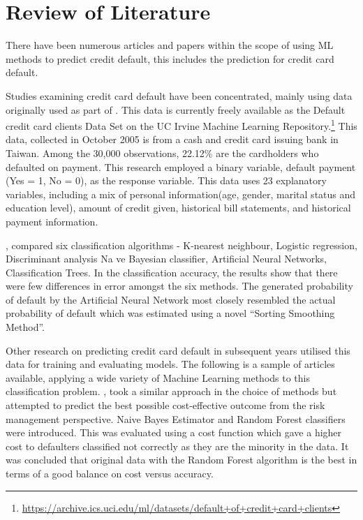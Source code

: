 \documentclass[
]{article}
\author{}
\date{\vspace{-2.5em}}
\begin{document}

\hypertarget{review-of-literature}{%
\section{Review of Literature}\label{review-of-literature}}

There have been numerous articles and papers within the scope of using
ML methods to predict credit default, this includes the prediction for
credit card default.

Studies examining credit card default have been concentrated, mainly
using data originally used as part of \citet{YEH20092473}. This data is
currently freely available as the Default credit card clients Data Set
on the UC Irvine Machine Learning Repository.\footnote{\url{https://archive.ics.uci.edu/ml/datasets/default+of+credit+card+clients}}
This data, collected in October 2005 is from a cash and credit card
issuing bank in Taiwan. Among the 30,000 observations, 22.12\% are the
cardholders who defaulted on payment. This research employed a binary
variable, default payment (Yes = 1, No = 0), as the response variable.
This data uses 23 explanatory variables, including a mix of personal
information(age, gender, marital status and education level), amount of
credit given, historical bill statements, and historical payment
information.

\citet{YEH20092473}, compared six classification algorithms - K-nearest
neighbour, Logistic regression, Discriminant analysis Na ve
Bayesian classifier, Artificial Neural Networks, Classification Trees.
In the classification accuracy, the results show that there were few
differences in error amongst the six methods. The generated probability
of default by the Artificial Neural Network most closely resembled the
actual probability of default which was estimated using a novel
``Sorting Smoothing Method''.

Other research on predicting credit card default in subsequent years
utilised this data for training and evaluating models. The following is
a sample of articles available, applying a wide variety of Machine
Learning methods to this classification problem. \citet{Neema2017TheCO},
took a similar approach in the choice of methods but attempted to
predict the best possible cost-effective outcome from the risk
management perspective. Naive Bayes Estimator and Random Forest
classifiers were introduced. This was evaluated using a cost function
which gave a higher cost to defaulters classified not correctly as they
are the minority in the data. It was concluded that original data with
the Random Forest algorithm is the best in terms of a good balance on
cost versus accuracy.
\end{document}
